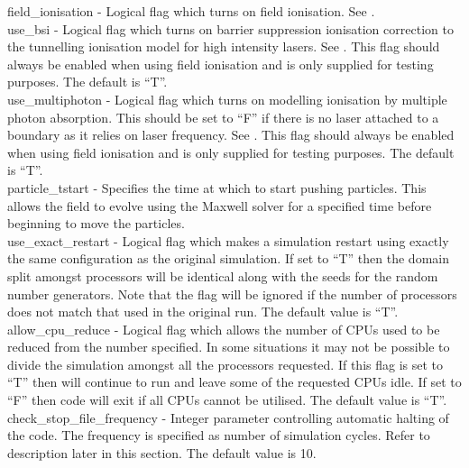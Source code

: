 {\emphtext field\_ionisation} - Logical flag which turns on field ionisation.
  See .\\

{\emphtext use\_bsi} - Logical flag which turns on barrier suppression
  ionisation correction to the tunnelling ionisation model for high intensity
  lasers. See . This flag should always be enabled when
  using field ionisation and is only supplied for testing purposes.
  The default is ``T''.\\

{\emphtext use\_multiphoton} - Logical flag which turns on modelling
  ionisation by multiple photon absorption. This should be set to ``F'' if
  there is no laser attached to a boundary as it relies on laser frequency.
  See . This flag should always be enabled when
  using field ionisation and is only supplied for testing purposes.
  The default is ``T''.\\

{\emphtext particle\_tstart} - Specifies the time at which to start pushing
particles. This allows the field to evolve using the Maxwell solver for a
specified time before beginning to move the particles.\\

{\emphtext use\_exact\_restart} - Logical flag which makes a simulation
  restart using exactly the same configuration as the original simulation. If
  set to ``T'' then the domain split amongst processors will be identical
  along with the seeds for the random number generators. Note that the flag
  will be ignored if the number of processors does not match that used in the
  original run. The default value is ``T''.\\

{\emphtext allow\_cpu\_reduce} - Logical flag which allows the number of CPUs
  used to be reduced from the number specified. In some situations it may not
  be possible to divide the simulation amongst all the processors requested.
  If this flag is set to ``T'' then {\EPOCH} will continue to run and leave
  some of the requested CPUs idle. If set to ``F'' then code will exit if all
  CPUs cannot be utilised. The default value is ``T''.\\

{\emphtext check\_stop\_file\_frequency} - Integer parameter controlling
  automatic halting of the code. The frequency is specified as number of
  simulation cycles. Refer to description later in this section.
  The default value is 10.\\

